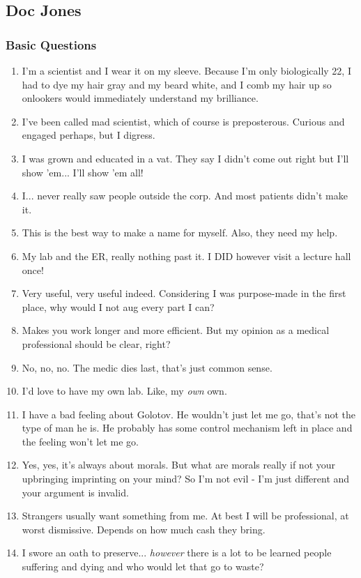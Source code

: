 \def\pfcname{Doc Jones}
\subsection{\pfcname}
\subsubsection{Basic Questions}
\begin{enumerate}
	\setlength\itemsep{-8mm}
	\item I'm a scientist and I wear it on my sleeve. Because I'm only biologically 22, I had to dye my hair gray and my beard white, and I comb my hair up so onlookers would immediately understand my brilliance.
	\item I've been called mad scientist, which of course is preposterous. Curious and engaged perhaps, but I digress.
	\item I was grown and educated in a vat. They say I didn't come out right but I'll show 'em... I'll show 'em all!
	\item I... never really saw people outside the corp. And most patients didn't make it.
	\item This is the best way to make a name for myself. Also, they need my help.
	\item My lab and the ER, really nothing past it. I DID however visit a lecture hall once!
	\item Very useful, very useful indeed. Considering I was purpose-made in the first place, why would I not aug every part I can?
	\item Makes you work longer and more efficient. But my opinion as a medical professional should be clear, right?
	\item No, no, no. The medic dies last, that's just common sense.
	\item I'd love to have my own lab. Like, my \textit{own} own.
	\item I have a bad feeling about Golotov. He wouldn't just let me go, that's not the type of man he is. He probably has some control mechanism left in place and the feeling won't let me go.
	\item Yes, yes, it's always about morals. But what are morals really if not your upbringing imprinting on your mind? So I'm not evil - I'm just different and your argument is invalid.
	\item Strangers usually want something from me. At best I will be professional, at worst dismissive. Depends on how much cash they bring.
	\item I swore an oath to preserve... \textit{however} there is a lot to be learned people suffering and dying and who would let that go to waste?

\end{enumerate}
